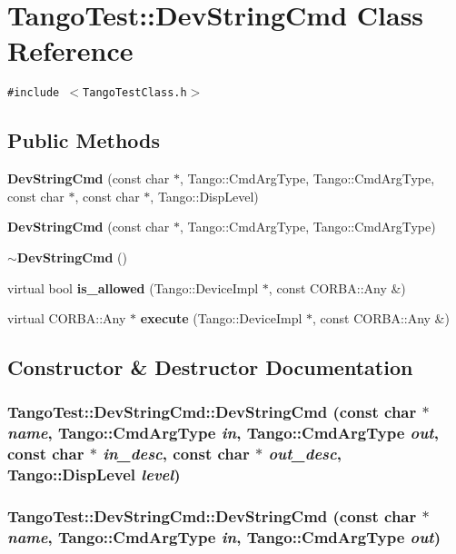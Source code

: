 \section{Tango\-Test::Dev\-String\-Cmd  Class Reference}
\label{classTangoTest_1_1DevStringCmd}
{\tt \#include $<$Tango\-Test\-Class.h$>$}

\subsection*{Public Methods}
\begin{CompactItemize}
\item 
{\bf Dev\-String\-Cmd} (const char $\ast$, Tango::Cmd\-Arg\-Type, Tango::Cmd\-Arg\-Type, const char $\ast$, const char $\ast$, Tango::Disp\-Level)
\item 
{\bf Dev\-String\-Cmd} (const char $\ast$, Tango::Cmd\-Arg\-Type, Tango::Cmd\-Arg\-Type)
\item 
{\bf $\sim$Dev\-String\-Cmd} ()
\item 
virtual bool {\bf is\_\-allowed} (Tango::Device\-Impl $\ast$, const CORBA::Any \&)
\item 
virtual CORBA::Any $\ast$ {\bf execute} (Tango::Device\-Impl $\ast$, const CORBA::Any \&)
\end{CompactItemize}


\subsection{Constructor \& Destructor Documentation}
\subsubsection{\setlength{\rightskip}{0pt plus 5cm}Tango\-Test::Dev\-String\-Cmd::Dev\-String\-Cmd (const char $\ast$ {\em name}, Tango::Cmd\-Arg\-Type {\em in}, Tango::Cmd\-Arg\-Type {\em out}, const char $\ast$ {\em in\_\-desc}, const char $\ast$ {\em out\_\-desc}, Tango::Disp\-Level {\em level})}\label{classTangoTest_1_1DevStringCmd_a0}


\subsubsection{\setlength{\rightskip}{0pt plus 5cm}Tango\-Test::Dev\-String\-Cmd::Dev\-String\-Cmd (const char $\ast$ {\em name}, Tango::Cmd\-Arg\-Type {\em in}, Tango::Cmd\-Arg\-Type {\em out})}\label{classTangoTest_1_1DevStringCmd_a1}


